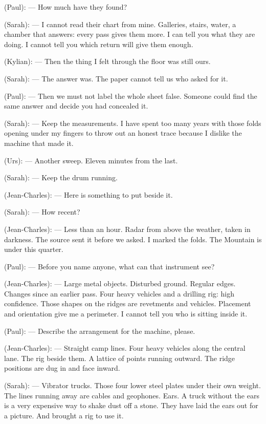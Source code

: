 \begin{room}
(Paul): --- How much have they found?

(Sarah): --- I cannot read their chart from mine. Galleries, stairs, water, a chamber that answers: every pass gives them more. I can tell you what they are doing. I cannot tell you which return will give them enough.

(Kylian): --- Then the thing I felt through the floor was still ours.

(Sarah): --- The answer was. The paper cannot tell us who asked for it.

(Paul): --- Then we must not label the whole sheet false. Someone could find the same answer and decide you had concealed it.

(Sarah): --- Keep the measurements. I have spent too many years with those folds opening under my fingers to throw out an honest trace because I dislike the machine that made it.

(Urs): --- Another sweep. Eleven minutes from the last.

(Sarah): --- Keep the drum running.

\centerline{}

(Jean-Charles): --- Here is something to put beside it.

(Sarah): --- How recent?

(Jean-Charles): --- Less than an hour. Radar from above the weather, taken in darkness. The source sent it before we asked. I marked the folds. The Mountain is under this quarter.

(Paul): --- Before you name anyone, what can that instrument see?

(Jean-Charles): --- Large metal objects. Disturbed ground. Regular edges. Changes since an earlier pass. Four heavy vehicles and a drilling rig: high confidence. Those shapes on the ridges are revetments and vehicles. Placement and orientation give me a perimeter. I cannot tell you who is sitting inside it.

(Paul): --- Describe the arrangement for the machine, please.

(Jean-Charles): --- Straight camp lines. Four heavy vehicles along the central lane. The rig beside them. A lattice of points running outward. The ridge positions are dug in and face inward.

(Sarah): --- Vibrator trucks. Those four lower steel plates under their own weight. The lines running away are cables and geophones. Ears. A truck without the ears is a very expensive way to shake dust off a stone. They have laid the ears out for a picture. And brought a rig to use it.


\end{room}

